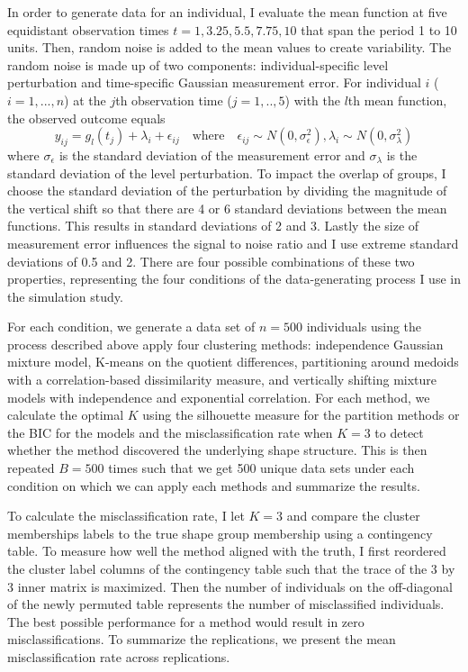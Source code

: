 \documentclass[12pt]{article}
\begin{document}
In order to generate data for an individual, I evaluate the mean function at five equidistant observation times $t=1,3.25,5.5,7.75,10$ that span the period 1 to 10 units. Then,  random noise is added to the mean values to create variability. The random noise is made up of two components: individual-specific level perturbation and time-specific Gaussian measurement error. For individual $i$ ($i=1,...,n$) at the $j$th observation time ($j=1,..,5$) with the $l$th mean function, the observed outcome equals
$$y_{ij} = g_{l}(t_{j})+\lambda_{i}+\epsilon_{ij}\quad\text{where}\quad \epsilon_{ij}\sim N(0,\sigma_{\epsilon}^{2}), \lambda_{i}\sim N(0,\sigma_{\lambda}^{2})$$
where $\sigma_{\epsilon}$  is the standard deviation of the measurement error and $\sigma_{\lambda}$ is the standard deviation of the level perturbation. To impact the overlap of groups, I choose the standard deviation of the perturbation by dividing the magnitude of the vertical shift so that there are 4 or 6 standard deviations between the mean functions. This results in standard deviations of 2 and 3. Lastly the size of measurement error influences the signal to noise ratio and I use extreme standard deviations of 0.5 and 2. There are four possible combinations of these two properties, representing the four  conditions of the data-generating process I use in the simulation study. 

For each condition, we generate a data set of $n=500$ individuals using the process described above apply four clustering methods: independence Gaussian mixture model, K-means on the quotient differences, partitioning around medoids with a correlation-based dissimilarity measure, and vertically shifting mixture models with independence and exponential correlation. For each method, we calculate the optimal $K$ using the silhouette measure \cite{kaufman1990}  for the partition methods or the BIC \cite{schwarz1978} for the models and the misclassification rate when $K=3$ to detect whether the method discovered the underlying shape structure. This is then repeated $B=500$ times such that we get 500 unique data sets under each condition on which we can apply each methods and summarize the results. 

To calculate the misclassification rate, I let $K=3$ and compare the cluster memberships labels to the true shape group membership using a contingency table. To measure how well the method aligned with the truth, I first reordered the cluster label columns of the contingency table such that the trace of the 3 by 3 inner matrix is maximized. Then the number of individuals on the off-diagonal of the newly permuted table represents the number of misclassified individuals. The best possible performance for a method would result in zero misclassifications. To summarize the replications, we present the mean misclassification rate across replications.
\end{document}

